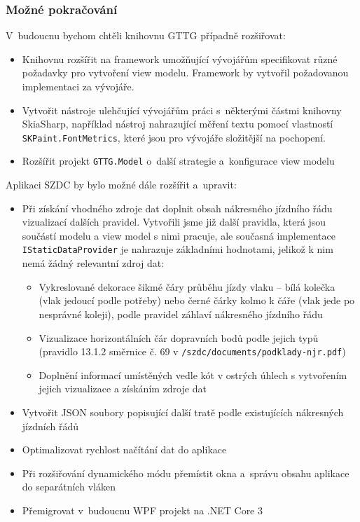 \subsubsection{Možné pokračování}
V~budoucnu bychom chtěli knihovnu GTTG případně rozšiřovat:
\begin{itemize}
	\item	Knihovnu rozšířit na framework umožňující vývojářům specifikovat různé požadavky pro vytvoření view modelu. Framework by vytvořil požadovanou implementaci za vývojáře.
	\item	Vytvořit nástroje ulehčující vývojářům práci s~některými částmi knihovny SkiaSharp, například nástroj nahrazující měření textu pomocí vlastností \linebreak \texttt{SKPaint.FontMetrics}, které jsou pro vývojáře složitější na pochopení.
	\item 	Rozšířit projekt \texttt{GTTG.Model} o~další strategie a~konfigurace view modelu
\end{itemize}

Aplikaci SZDC by bylo možné dále rozšířit a~upravit:
\begin{itemize}
	\item	Při získání vhodného zdroje dat doplnit obsah nákresného jízdního řádu vizualizací dalších pravidel. Vytvořili jsme již další pravidla, která jsou součástí modelu a view model s nimi pracuje, ale současná implementace \texttt{IStaticDataProvider} je nahrazuje základními hodnotami, jelikož k nim nemá žádný relevantní zdroj dat:
	\begin{itemize}
		 \item  Vykreslované dekorace šikmé čáry průběhu jízdy vlaku -- bílá kolečka (vlak jedoucí podle potřeby) nebo černé čárky kolmo k čáře (vlak jede po nesprávné koleji), podle pravidel záhlaví nákresného jízdního řádu
		 \item	Vizualizace horizontálních čár dopravních bodů podle jejich typů (pravidlo 13.1.2 směrnice č. 69 v \texttt{/szdc/documents/podklady-njr.pdf})
		 \item  Doplnění informací umístěných vedle kót v ostrých úhlech s vytvořením jejich vizualizace a získáním zdroje dat
	\end{itemize}
	\item	Vytvořit JSON soubory popisující další tratě podle existujících nákresných jízdních řádů
	\item	Optimalizovat rychlost načítání dat do aplikace
	\item	Při rozšiřování dynamického módu přemístit okna a~správu obsahu aplikace do separátních vláken
	\item   Přemigrovat v~budoucnu WPF projekt na .NET Core 3 
\end{itemize}

